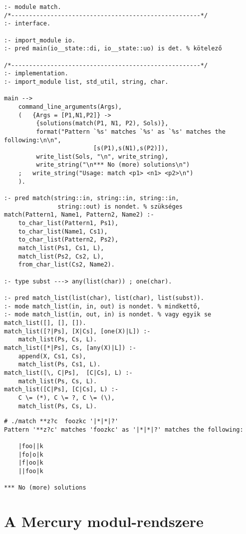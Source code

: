 \begin{verbatim}
:- module match.
/*-----------------------------------------------------*/
:- interface.

:- import_module io.
:- pred main(io__state::di, io__state::uo) is det. % kötelező

/*-----------------------------------------------------*/
:- implementation.
:- import_module list, std_util, string, char.

main --> 
    command_line_arguments(Args),
    (   {Args = [P1,N1,P2]} ->
         {solutions(match(P1, N1, P2), Sols)},
         format("Pattern `%s' matches `%s' as `%s' matches the following:\n\n",
                         [s(P1),s(N1),s(P2)]),
         write_list(Sols, "\n", write_string),
         write_string("\n*** No (more) solutions\n")
    ;   write_string("Usage: match <p1> <n1> <p2>\n")
    ).

:- pred match(string::in, string::in, string::in,
               string::out) is nondet. % szükséges
match(Pattern1, Name1, Pattern2, Name2) :-
    to_char_list(Pattern1, Ps1),
    to_char_list(Name1, Cs1),
    to_char_list(Pattern2, Ps2),
    match_list(Ps1, Cs1, L),
    match_list(Ps2, Cs2, L),
    from_char_list(Cs2, Name2).

:- type subst ---> any(list(char)) ; one(char).

:- pred match_list(list(char), list(char), list(subst)).
:- mode match_list(in, in, out) is nondet. % mindkettő,
:- mode match_list(in, out, in) is nondet. % vagy egyik se
match_list([], [], []).
match_list([?|Ps], [X|Cs], [one(X)|L]) :-
    match_list(Ps, Cs, L).
match_list([*|Ps], Cs, [any(X)|L]) :-
    append(X, Cs1, Cs),
    match_list(Ps, Cs1, L).
match_list([\, C|Ps],  [C|Cs], L) :-
    match_list(Ps, Cs, L).
match_list([C|Ps], [C|Cs], L) :-
    C \= (*), C \= ?, C \= (\), 
    match_list(Ps, Cs, L).
\end{verbatim}

\begin{verbatim}
# ./match **z?c  foozkc '|*|*|?'
Pattern '**z?c' matches 'foozkc' as '|*|*|?' matches the following:

    |foo||k
    |fo|o|k
    |f|oo|k
    ||foo|k

*** No (more) solutions
\end{verbatim}

\section{A Mercury modul-rendszere}

